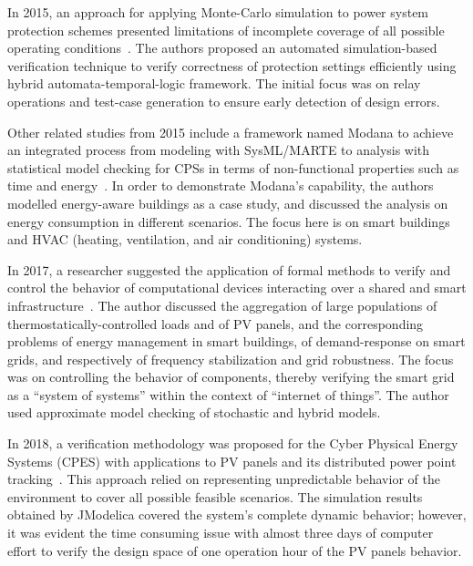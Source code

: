 \documentclass[runningheads]{llncs}
\begin{document}
In 2015, an approach for applying Monte-Carlo simulation to power system protection schemes presented limitations of incomplete coverage of all possible operating conditions~\cite{Sengupta2015}. The authors proposed an automated simulation-based verification technique to verify correctness of protection settings efficiently using hybrid automata-temporal-logic framework. The initial focus was on relay operations and test-case generation to ensure early detection of design errors. %

Other related studies from 2015 include a framework named Modana to achieve an integrated process from modeling with SysML/MARTE to analysis with statistical model checking for CPSs in terms of non-functional properties such as time and energy~\cite{Cheng2015}. In order to demonstrate Modana's capability, the authors modelled energy-aware buildings as a case study, and discussed the analysis on energy consumption in different scenarios. The focus here is on smart buildings and HVAC (heating, ventilation, and air conditioning) systems. %
 
In 2017, a researcher suggested the application of formal methods to verify and control the behavior of computational devices interacting over a shared and smart infrastructure~\cite{Abate2017}. The author discussed the aggregation of large populations of thermostatically-controlled loads and of PV panels, and the corresponding problems of energy management in smart buildings, of demand-response on smart grids, and respectively of frequency stabilization and grid robustness. The focus was on controlling the behavior of components, thereby verifying the smart grid as a ``system of systems'' within the context of ``internet of things''. The author used approximate model checking of stochastic and hybrid models.

In 2018, a verification methodology was proposed for the Cyber Physical Energy Systems (CPES) with applications to PV panels and its distributed power point tracking~\cite{Driouich2018}. This approach relied on representing unpredictable behavior of the environment to cover all possible feasible scenarios. The simulation results obtained by JModelica covered the system's complete dynamic behavior; however, it was evident the time consuming issue with almost three days of computer effort to verify the design space of one operation hour of the PV panels behavior. %
\end{document}
